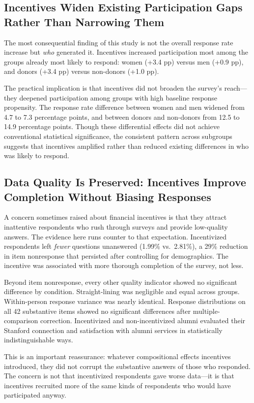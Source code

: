 \documentclass[12pt]{article}
\begin{document}
\subsection{Incentives Widen Existing Participation Gaps Rather Than Narrowing Them}

The most consequential finding of this study is not the overall response rate increase but \textit{who} generated it. Incentives increased participation most among the groups already most likely to respond: women (+3.4 pp) versus men (+0.9 pp), and donors (+3.4 pp) versus non-donors (+1.0 pp).

The practical implication is that incentives did not broaden the survey's reach---they deepened participation among groups with high baseline response propensity. The response rate difference between women and men widened from 4.7 to 7.3 percentage points, and between donors and non-donors from 12.5 to 14.9 percentage points. Though these differential effects did not achieve conventional statistical significance, the consistent pattern across subgroups suggests that incentives amplified rather than reduced existing differences in who was likely to respond.

\subsection{Data Quality Is Preserved: Incentives Improve Completion Without Biasing Responses}

A concern sometimes raised about financial incentives is that they attract inattentive respondents who rush through surveys and provide low-quality answers. The evidence here runs counter to that expectation. Incentivized respondents left \textit{fewer} questions unanswered (1.99\% vs.\ 2.81\%), a 29\% reduction in item nonresponse that persisted after controlling for demographics. The incentive was associated with more thorough completion of the survey, not less.

Beyond item nonresponse, every other quality indicator showed no significant difference by condition. Straight-lining was negligible and equal across groups. Within-person response variance was nearly identical. Response distributions on all 42 substantive items showed no significant differences after multiple-comparison correction. Incentivized and non-incentivized alumni evaluated their Stanford connection and satisfaction with alumni services in statistically indistinguishable ways.

This is an important reassurance: whatever compositional effects incentives introduced, they did not corrupt the substantive answers of those who responded. The concern is not that incentivized respondents gave worse data---it is that incentives recruited more of the same kinds of respondents who would have participated anyway.
\end{document}
